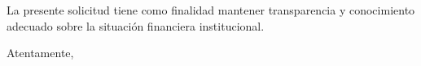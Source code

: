 \documentclass[a4paper,12pt]{article}
\begin{document}
\vspace{0.5cm}

\noindent La presente solicitud tiene como finalidad mantener transparencia y conocimiento adecuado sobre la situación financiera institucional.

\noindent Atentamente,

\vspace{2.5cm}


\noindent{}  

\noindent{}      

\noindent{}  

\noindent{} 
\end{document}
